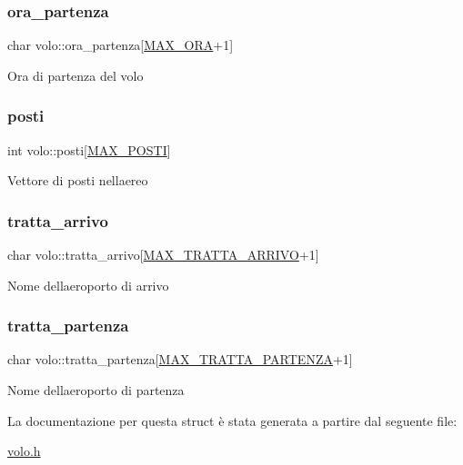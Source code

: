 \subsubsection{\texorpdfstring{ora\+\_\+partenza}{ora\_partenza}}
{\footnotesize\ttfamily char volo\+::ora\+\_\+partenza\mbox{[}\hyperlink{define_8h_a0e20e0c8264b18234ee1c3f1eb4943f0}{M\+A\+X\+\_\+\+O\+RA}+1\mbox{]}}

Ora di partenza del volo \mbox{\label{structvolo_a4c44037f3356f18a3988d053140b50e6}} 
\subsubsection{\texorpdfstring{posti}{posti}}
{\footnotesize\ttfamily int volo\+::posti\mbox{[}\hyperlink{define_8h_acd54e9b4d24bd6ee9734fdbda3c84b61}{M\+A\+X\+\_\+\+P\+O\+S\+TI}\mbox{]}}

Vettore di posti nell\textquotesingle{}aereo \mbox{\label{structvolo_a4c8e5cd5b376a3bdbad447c91958f1cf}} 
\subsubsection{\texorpdfstring{tratta\+\_\+arrivo}{tratta\_arrivo}}
{\footnotesize\ttfamily char volo\+::tratta\+\_\+arrivo\mbox{[}\hyperlink{define_8h_a05232cbd6b297f57ebd68e3b2c1e8ae2}{M\+A\+X\+\_\+\+T\+R\+A\+T\+T\+A\+\_\+\+A\+R\+R\+I\+VO}+1\mbox{]}}

Nome dell\textquotesingle{}aeroporto di arrivo \mbox{\label{structvolo_aa4a9d235713346ceddd35b7881c2f508}} 
\subsubsection{\texorpdfstring{tratta\+\_\+partenza}{tratta\_partenza}}
{\footnotesize\ttfamily char volo\+::tratta\+\_\+partenza\mbox{[}\hyperlink{define_8h_a3789b4d474f4561cdccbcd94a52e9ac2}{M\+A\+X\+\_\+\+T\+R\+A\+T\+T\+A\+\_\+\+P\+A\+R\+T\+E\+N\+ZA}+1\mbox{]}}

Nome dell\textquotesingle{}aeroporto di partenza 

La documentazione per questa struct è stata generata a partire dal seguente file\+:\begin{DoxyCompactItemize}
\item 
\hyperlink{volo_8h}{volo.\+h}\end{DoxyCompactItemize}
